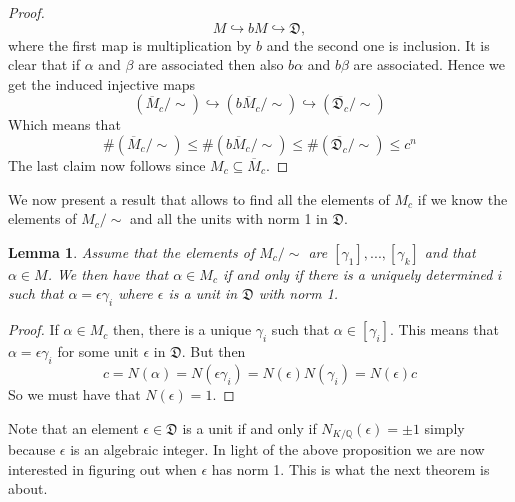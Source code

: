 \documentclass{article}
\newtheorem{lemma}{Lemma}[section]
\newcommand{\mfrak}[1]{\mathfrak{#1}}
\newcommand{\mbb}[1]{\mathbb{#1}}
\begin{document}
\begin{proof}
$$M \hookrightarrow bM \hookrightarrow \mfrak D,$$
where the first map is multiplication by $b$ and the second one is inclusion. It is clear that if $\alpha$ and $\beta$ are associated then also $b\alpha$ and $b\beta$ are associated. Hence we get the induced injective maps
$$(\overline M_c / \sim) \hookrightarrow (b\overline M_c / \sim) \hookrightarrow (\overline {\mfrak D_c} / \sim) $$
Which means that $$\# (\overline M_c / \sim) \leq \# (b\overline M_c / \sim) \leq \# (\overline {\mfrak D_c} / \sim) \leq c^n$$ 
The last claim now follows since $M_c \subseteq \overline M_c$.  

\end{proof}
We now present a result that allows to find all the elements of $M_c$ if we know the elements of $M_c / \sim$ and all the units with norm 1 in $\mfrak D$.
\begin{lemma} \label{lem: writing of elements of Mc}
    Assume that the elements of $M_c / \sim$ are $[\gamma_1], ..., [\gamma_k]$ and that $\alpha \in M$. We then have that $\alpha \in M_c$ if and only if there is a uniquely determined $i$ such that $\alpha = \epsilon \gamma_i$ where $\epsilon$ is a unit in $\mfrak D$ with norm 1.
\end{lemma}

\begin{proof}
    
If $\alpha \in M_c$ then, there is a unique $\gamma_i$ such that $\alpha \in [\gamma_i]$. This means that $\alpha = \epsilon \gamma_i$ for some unit $\epsilon$ in $\mfrak D$. But then $$c = N(\alpha) = N(\epsilon \gamma_i) = N(\epsilon)N(\gamma_i) = N(\epsilon)c$$
So we must have that $N(\epsilon) = 1$. 
\end{proof}
Note that an element $\epsilon \in \mfrak D$ is a unit if and only if $N_{K/\mbb Q}(\epsilon) = \pm 1$ simply because $\epsilon$ is an algebraic integer. In light of the above proposition we are now interested in figuring out when $\epsilon$ has norm 1. This is what the next theorem is about.
\end{document}
